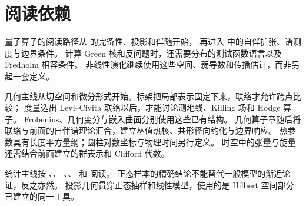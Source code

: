 \chapter*{阅读依赖}

量子算子的阅读路径从  的完备性、投影和伴随开始，
再进入  中的自伴扩张、谱测度与边界条件。
计算 Green 核和反问题时，还需要分布的测试函数语言以及 Fredholm 相容条件。
非线性演化继续使用这些空间、弱导数和传播估计，而非另起一套定义。

几何主线从切空间和微分形式开始。标架把局部表示固定下来，联络才允许跨点比较；
度量选出 Levi--Civita 联络以后，才能讨论测地线、Killing 场和 Hodge 算子。
Frobenius、几何变分与嵌入曲面分别使用这些已有结构。
几何算子章随后将联络与前面的自伴谱理论汇合，建立丛值热核、共形径向约化与边界响应。
热参数具有长度平方量纲；圆柱对数坐标与物理时间另行定义。
时空中的张量与旋量还需结合前面建立的群表示和 Clifford 代数。

统计主线按 、、
、、
 和  阅读。
正态样本的精确结论不能替代一般模型的渐近论证，反之亦然。
投影几何贯穿正态抽样和线性模型，使用的是 Hilbert 空间部分已建立的同一工具。

